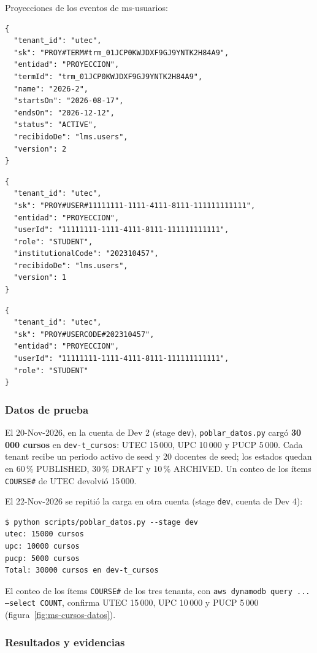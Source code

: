 Proyecciones de los eventos de ms-usuarios:

\begin{lstlisting}
{
  "tenant_id": "utec",
  "sk": "PROY#TERM#trm_01JCP0KWJDXF9GJ9YNTK2H84A9",
  "entidad": "PROYECCION",
  "termId": "trm_01JCP0KWJDXF9GJ9YNTK2H84A9",
  "name": "2026-2",
  "startsOn": "2026-08-17",
  "endsOn": "2026-12-12",
  "status": "ACTIVE",
  "recibidoDe": "lms.users",
  "version": 2
}
\end{lstlisting}

\begin{lstlisting}
{
  "tenant_id": "utec",
  "sk": "PROY#USER#11111111-1111-4111-8111-111111111111",
  "entidad": "PROYECCION",
  "userId": "11111111-1111-4111-8111-111111111111",
  "role": "STUDENT",
  "institutionalCode": "202310457",
  "recibidoDe": "lms.users",
  "version": 1
}
\end{lstlisting}

\begin{lstlisting}
{
  "tenant_id": "utec",
  "sk": "PROY#USERCODE#202310457",
  "entidad": "PROYECCION",
  "userId": "11111111-1111-4111-8111-111111111111",
  "role": "STUDENT"
}
\end{lstlisting}

\subsubsection{Datos de prueba}
El 20-Nov-2026, en la cuenta de Dev 2 (stage \texttt{dev}), \texttt{poblar\_datos.py}
cargó \textbf{30\,000 cursos} en \texttt{dev-t\_cursos}: UTEC 15\,000, UPC 10\,000 y PUCP 5\,000. Cada tenant
recibe un periodo activo de seed y 20 docentes de seed; los estados quedan en 60\,\% PUBLISHED, 30\,\% DRAFT y
10\,\% ARCHIVED. Un conteo de los ítems \texttt{COURSE\#} de UTEC devolvió 15\,000.

El 22-Nov-2026 se repitió la carga en otra cuenta (stage \texttt{dev}, cuenta de Dev 4):

\begin{lstlisting}
$ python scripts/poblar_datos.py --stage dev
utec: 15000 cursos
upc: 10000 cursos
pucp: 5000 cursos
Total: 30000 cursos en dev-t_cursos
\end{lstlisting}

El conteo de los ítems \texttt{COURSE\#} de los tres tenants, con \texttt{aws dynamodb query ... --select COUNT}, confirma UTEC 15\,000, UPC 10\,000 y PUCP 5\,000 (figura~\ref{fig:ms-cursos-datos}).


\subsubsection{Resultados y evidencias}
